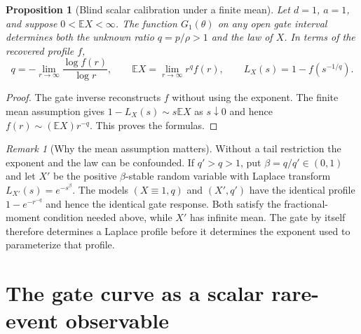 \documentclass[11pt,letterpaper]{article}
\newtheorem{proposition}[theorem]{Proposition}
\theoremstyle{definition}
\theoremstyle{remark}
\newtheorem{remark}[theorem]{Remark}
\newcommand{\E}{\mathbb E}
\newcommand{\1}{\mathbf 1}
\begin{document}
\begin{proposition}[Blind scalar calibration under a finite mean]
\label{p07:prop:gate-scalar-calibration}
Let $d=1$, $a=1$, and suppose $0<\E X<\infty$. The function
$G_1(\theta)$ on any open gate interval determines both the unknown ratio
$q=p/\rho>1$ and the law of $X$. In terms of the recovered profile $f$,
\begin{equation}\label{p07:eq:gate-blind-q}
 q=-\lim_{r\to\infty}\frac{\log f(r)}{\log r},\qquad
 \E X=\lim_{r\to\infty}r^q f(r),\qquad
 L_X(s)=1-f(s^{-1/q}).
\end{equation}
\end{proposition}
\begin{proof}
The gate inverse reconstructs $f$ without using the exponent. The finite
mean assumption gives $1-L_X(s)\sim s\E X$ as $s\downarrow0$ and hence
$f(r)\sim(\E X)r^{-q}$. This proves the formulas.
\end{proof}

\begin{remark}[Why the mean assumption matters]
Without a tail restriction the exponent and the law can be confounded.
If $q'>q>1$, put $\beta=q/q'\in(0,1)$ and let $X'$ be the positive
$\beta$-stable random variable with Laplace transform
$L_{X'}(s)=e^{-s^\beta}$. The models $(X\equiv1,q)$ and $(X',q')$ have
the identical profile
$1-e^{-r^{-q}}$ and hence the identical gate response. Both satisfy the
fractional-moment condition needed above, while $X'$ has infinite mean.
The gate by itself therefore determines a Laplace profile before it
determines the exponent used to parameterize that profile.
\end{remark}

\section{The gate curve as a scalar rare-event observable}
\label{p07:sec:gate-ldp}
\end{document}
